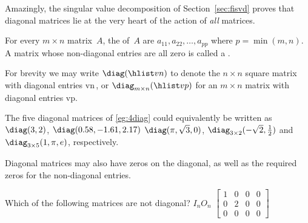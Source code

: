 Amazingly, the singular value decomposition of Section~\ref{sec:fisvd} proves that diagonal matrices lie at the very heart of the action of \emph{all} matrices.

\begin{definition} \label{def:diag} 
For every \(m\times n\) matrix~\(A\), the  of~\(A\) are \(a_{11},a_{22},\ldots,a_{pp}\) where \(p=\min(m,n)\).
A matrix whose non-diagonal entries are all zero is called a .

For brevity we may write \(\diag(\hlist vn)\) to denote the \(n\times n\) square matrix with diagonal entries \hlist vn\,, or \(\diag_{m\times n}(\hlist vp)\) for an \(m\times n\) matrix with diagonal entries \hlist vp.
\end{definition}

\begin{example} \label{eg:} \sloppy
The five diagonal matrices of \autoref{eg:4diag} could equivalently be written as \(\diag(3,2)\), \(\diag(0.58,-1.61,2.17)\) \(\diag(\pi,\sqrt3,0)\), \(\diag_{3\times2}(-\sqrt2,\tfrac12)\) and \(\diag_{3\times5}(1,\pi,e)\), respectively.
\end{example}


Diagonal matrices may also have zeros on the diagonal, as well as the required zeros for the non-diagonal entries.


\begin{activity}
Which of the following matrices are not diagonal?
{\(I_n\)}{\(O_n\)}
{\(\begin{bmatrix} 1&0&0&0
\\0&2&0&0
\\0&0&0&0 \end{bmatrix}\)}
\end{activity}
  


